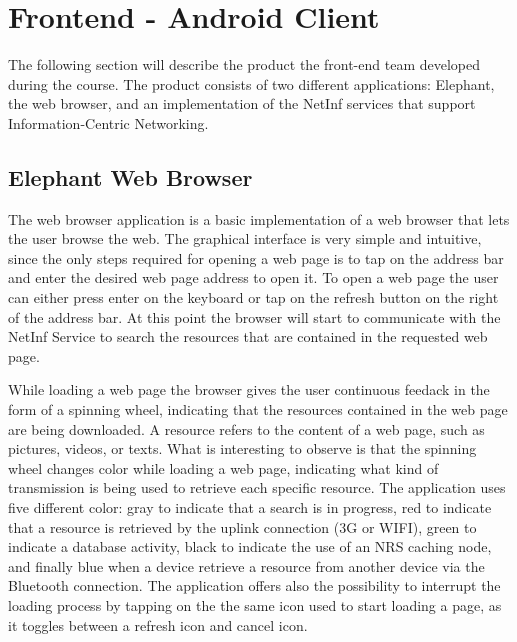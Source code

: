 \section {Frontend - Android Client}
The following section will describe the product the front-end team developed during the course.
The product consists of two different applications: Elephant, the web browser, and an implementation
of the NetInf services that support Information-Centric Networking.

\subsection{Elephant Web Browser}
The web browser application is a basic implementation of a web browser that lets the user browse
the web. The graphical interface is very simple and intuitive, since the only steps required for
opening a web page is to tap on the address bar and enter the desired web page address to open it.
To open a web page the user can either press enter on the keyboard or tap on the refresh button on the right
of the address bar. At this point the browser will start to communicate with the NetInf Service to
search the resources that are contained in the requested web page.

While loading a web page the browser gives the user continuous feedack in the form of a spinning wheel,
indicating that the resources contained in the web page are being downloaded.
A resource refers to the content of a web page, such as pictures, videos, or texts.
What is interesting to observe is that the spinning wheel changes color while loading a web page,
indicating what kind of transmission is being used to retrieve each specific resource.
The application uses five different color: gray to indicate that a search is in progress, red to indicate
that a resource is retrieved by the uplink connection (3G or WIFI), green to indicate a database activity,
black to indicate the use of an NRS caching node, and finally blue when a device retrieve a resource from
another device via the Bluetooth connection. The application offers also the possibility to interrupt the
loading process by tapping on the the same icon used to start loading a page, as it toggles between a refresh
icon and cancel icon.\\


